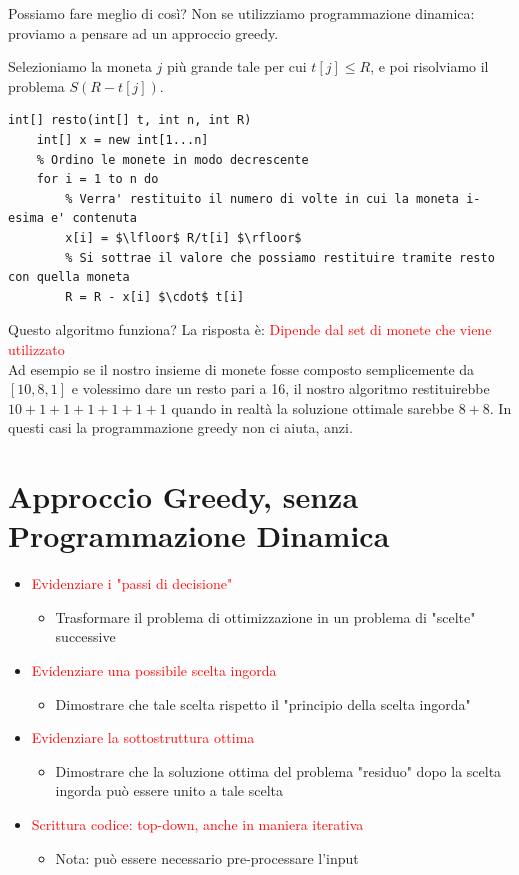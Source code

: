 \documentclass[../cheatSheetAlgoritmi.tex]{subfiles}
\begin{document}
Possiamo fare meglio di così? Non se utilizziamo programmazione dinamica: proviamo a pensare ad un approccio greedy.
\begin{center}
Selezioniamo la moneta $j$ più grande tale per cui $t[j] \leq R$, e poi risolviamo il problema $S(R - t[j])$.
\end{center}
 
\begin{lstlisting}[caption=Resto (Greedy)]
int[] resto(int[] t, int n, int R)
	int[] x = new int[1...n]
	% Ordino le monete in modo decrescente
	for i = 1 to n do
		% Verra' restituito il numero di volte in cui la moneta i-esima e' contenuta
		x[i] = $\lfloor$ R/t[i] $\rfloor$
		% Si sottrae il valore che possiamo restituire tramite resto con quella moneta
		R = R - x[i] $\cdot$ t[i]
\end{lstlisting}
Questo algoritmo funziona? La risposta è: \textcolor{red}{Dipende dal set di monete che viene utilizzato}\\
Ad esempio se il nostro insieme di monete fosse composto semplicemente da $[10, 8, 1]$ e volessimo dare un resto pari a 16, il nostro algoritmo restituirebbe $10 + 1 + 1 + 1+ 1 + 1 + 1$ quando in realtà la soluzione ottimale sarebbe $8 + 8$. In questi casi la programmazione greedy non ci aiuta, anzi.

\section{Approccio Greedy, senza Programmazione Dinamica}
\begin{itemize}
	\item \textcolor{red}{Evidenziare i "passi di decisione"}
	\begin{itemize}
		\item Trasformare il problema di ottimizzazione in un problema di
"scelte" successive
	\end{itemize}
	\item \textcolor{red}{Evidenziare una possibile scelta ingorda}
	\begin{itemize}
		\item Dimostrare che tale scelta rispetto il "principio della scelta ingorda"
	\end{itemize}
	\item \textcolor{red}{Evidenziare la sottostruttura ottima}
	\begin{itemize}
		\item Dimostrare che la soluzione ottima del problema "residuo" dopo la
scelta ingorda può essere unito a tale scelta
	\end{itemize}
	\item \textcolor{red}{Scrittura codice: top-down, anche in maniera iterativa}
	\begin{itemize}
		\item Nota: può essere necessario pre-processare l'input
	\end{itemize}
\end{itemize}
\end{document}
